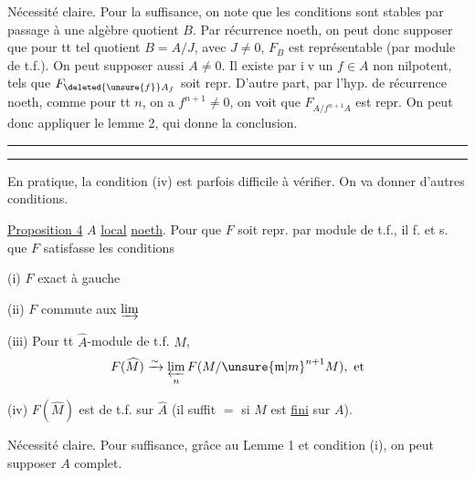 Nécessité claire. Pour la suffisance, on note que les conditions sont stables par passage à une algèbre quotient $B$. Par récurrence noeth, on peut donc supposer que pour tt tel quotient $B=A/J$, avec $J\ne0$, $F_B$ est représentable (par module de t.f.). On peut supposer aussi $A\ne0$. Il existe par \textcircled{\scriptsize iv} un $f\in A$ non nilpotent, tels que $F_{\deleted{\unsure{f}}A_f}$ soit repr. D'autre part, par l'hyp. de récurrence noeth, comme pour tt $n$, on a $f^{n+1}\ne0$, on voit que $F_{A/f^{n+1}A}$ est repr. On peut donc appliquer le lemme 2, qui donne la conclusion.

\noindent\rule{\linewidth}{0.4pt}\par\nobreak\noindent\rule{\linewidth}{0.4pt}

En pratique, la condition (iv) est parfois difficile à vérifier. On va donner d'autres conditions.

\uline{Proposition 4} \quad $A$ \uline{local} \uline{noeth}. Pour que $F$ soit repr. par module de t.f., il f. et s. que $F$ satisfasse les conditions

(i) $F$ exact à gauche

(ii) $F$ commute aux $\varinjlim$

(iii) Pour tt $\widehat A$-module de t.f. $M$,
\[
F(\widehat M)\xrightarrow{\sim}\varprojlim_{n}F(M/{\unsure{\mathfrak m|m}}^{n+1}M),\ \text{et}
\]

(iv)  $F(\widehat M)$ est de t.f. sur $\widehat A$ (il suffit $=$ si $M$ est \uline{fini} sur $A$).

Nécessité claire. Pour suffisance, grâce au Lemme 1 et condition (i), on peut supposer $A$ complet.

